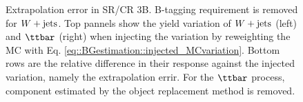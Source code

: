 \begin{figure}[h]
  \centering
 \caption{Extrapolation error in SR/CR 3B. B-tagging requirement is removed for $W+\mathrm{jets}$. Top pannels show the yield variation of $W+\mathrm{jets}$ (left) and $\ttbar$ (right) when injecting the variation by reweighting the MC with Eq. \ref{eq::BGestimation::injected_MCvariation}. Bottom rows are the relative difference in their response against the injected variation, namely the extrapolation errir. For the $\ttbar$ process, component estimated by the object replacement method is removed.  \label{fig::BGestimation::valid_extp_3B} }
\end{figure}




